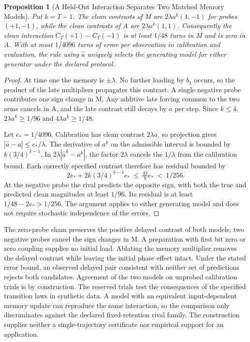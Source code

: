 \documentclass[11pt,a4paper]{article}
\newtheorem{proposition}{Proposition}[section]
\begin{document}
\begin{proposition}[A Held-Out Interaction Separates Two Matched Memory Models]\label{prop:heldout-memory-interaction}
Put $k=T-1$. The clean contrasts of M are $2\lambda a^k(1,-1)$ for probes $(+1,-1)$, while the clean contrasts of A are $2\lambda a^k(1,1)$. Consequently the clean interaction $C_T(+1)-C_T(-1)$ is at least $1/48$ turns in M and is zero in A. With at most $1/4096$ turns of error per observation in calibration and evaluation, the rule using $\hat a$ uniquely selects the generating model for either generator under the declared protocol.
\end{proposition}
\begin{proof}
At time one the memory is $\pm\lambda$. No further loading by $b_1$ occurs, so the product of the late multipliers propagates this contrast. A single negative probe contributes one sign change in M. Any additive late forcing common to the two arms cancels in A, and the late contrast still decays by $a$ per step. Since $k\le4$, $2\lambda a^k\ge1/96$ and $4\lambda a^k\ge1/48$.

Let $e_\ast=1/4096$. Calibration has clean contrast $2\lambda a$, so projection gives $|\hat a-a|\le e_\ast/\lambda$. The derivative of $a^k$ on the admissible interval is bounded by $k(3/4)^{k-1}$. In $2\lambda|\hat a^k-a^k|$, the factor $2\lambda$ cancels the $1/\lambda$ from the calibration bound. Each correctly specified contrast therefore has residual bounded by
\[
 2e_\ast+2k(3/4)^{k-1} e_\ast \ \le\ \tfrac{43}{8}e_\ast \ <\ 1/256.
\]
At the negative probe the rival predicts the opposite sign, with both the true and predicted clean magnitudes at least $1/96$. Its residual is at least $1/48-2e_\ast>1/256$. The argument applies to either generating model and does not require stochastic independence of the errors.
\end{proof}

The zero-probe sham preserves the positive delayed contrast of both models; two negative probes cancel the sign changes in M. A preparation with first bit zero or zero coupling supplies no initial load. Ablating the memory multiplier removes the delayed contrast while leaving the initial phase effect intact. Under the stated error bound, an observed delayed pair consistent with neither set of predictions rejects both candidates. Agreement of the two models on unprobed calibration trials is by construction. The reserved trials test the consequences of the specified transition laws in synthetic data. A model with an equivalent input-dependent memory update can reproduce the same interaction, so the comparison only discriminates against the declared fixed-retention rival family. The construction supplies neither a single-trajectory certificate nor empirical support for an application.
\end{document}
